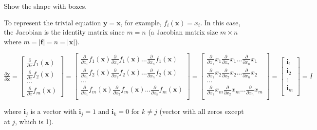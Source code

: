 \documentclass[11pt]{article}
\begin{document}
Show the shape with boxes.  

To represent the trivial equation $\mathbf{y} = \mathbf{x}$, for example, $f_i(\mathbf{x}) = x_i$. In this case, the Jacobian is the identity matrix since $m=n$ (a Jacobian matrix size $m \times n$ where $m = |\mathbf{f}| = n = |\mathbf{x}|$).

$
\frac{\partial \mathbf{y}}{\partial \mathbf{x}} = \begin{bmatrix}
\frac{\partial}{\partial {x}} f_1(\mathbf{x}) \\
\frac{\partial}{\partial {x}} f_2(\mathbf{x})\\
\ldots\\
\frac{\partial}{\partial {x}} f_m(\mathbf{x})
\end{bmatrix} = \begin{bmatrix}
\frac{\partial}{\partial {x_1}} f_1(\mathbf{x}) \frac{\partial}{\partial {x_2}} f_1(\mathbf{x}) \ldots \frac{\partial}{\partial {x_n}} f_1(\mathbf{x}) \\
\frac{\partial}{\partial {x_1}} f_2(\mathbf{x}) \frac{\partial}{\partial {x_2}} f_2(\mathbf{x}) \ldots \frac{\partial}{\partial {x_n}} f_2(\mathbf{x}) \\
\ldots\\
\frac{\partial}{\partial {x_1}} f_m(\mathbf{x}) \frac{\partial}{\partial {x_2}} f_m(\mathbf{x}) \ldots \frac{\partial}{\partial {x_n}} f_m(\mathbf{x}) \\
\end{bmatrix} = \begin{bmatrix}
\frac{\partial}{\partial {x_1}} x_1 \frac{\partial}{\partial {x_2}} x_1 \ldots \frac{\partial}{\partial {x_n}} x_1 \\
\frac{\partial}{\partial {x_1}} x_2 \frac{\partial}{\partial {x_2}} x_2 \ldots \frac{\partial}{\partial {x_n}} x_2 \\
\ldots\\
\frac{\partial}{\partial {x_1}} x_m \frac{\partial}{\partial {x_2}} x_m \ldots \frac{\partial}{\partial {x_n}} x_m \\
\end{bmatrix} = \begin{bmatrix}
           \mathbf{i}_1\\
           \mathbf{i}_2\\
           \vdots \\
           \mathbf{i}_m\\
           \end{bmatrix} = I
$

where $\mathbf{i}_j$ is a vector with $\mathbf{i}_j=1$ and $\mathbf{i}_k=0$ for $k \neq j$ (vector with all zeros except at $j$, which is 1).
\end{document}
